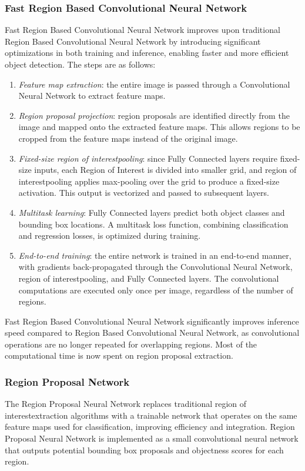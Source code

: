 \subsubsection{Fast Region Based Convolutional Neural Network}
Fast Region Based Convolutional Neural Network improves upon traditional Region Based Convolutional Neural Network by introducing significant optimizations in both training and inference, enabling faster and more efficient object detection.
The steps are as follows: 
\begin{enumerate}
    \item \textit{Feature map extraction}: the entire image is passed through a Convolutional Neural Network to extract feature maps.
    \item \textit{Region proposal projection}: region proposals are identified directly from the image and mapped onto the extracted feature maps. 
        This allows regions to be cropped from the feature maps instead of the original image.
    \item \textit{Fixed-size region of interestpooling}: since Fully Connected layers require fixed-size inputs, each Region of Interest is divided into smaller grid, and region of interestpooling applies max-pooling over the grid to produce a fixed-size activation. 
        This output is vectorized and passed to subsequent layers.
    \item \textit{Multitask learning}: Fully Connected layers predict both object classes and bounding box locations.
        A multitask loss function, combining classification and regression losses, is optimized during training.
    \item \textit{End-to-end training}: the entire network is trained in an end-to-end manner, with gradients back-propagated through the Convolutional Neural Network, region of interestpooling, and Fully Connected layers.
        The convolutional computations are executed only once per image, regardless of the number of regions.
\end{enumerate}
Fast Region Based Convolutional Neural Network significantly improves inference speed compared to Region Based Convolutional Neural Network, as convolutional operations are no longer repeated for overlapping regions.
Most of the computational time is now spent on region proposal extraction. 

\subsubsection{Region Proposal Network}
The Region Proposal Neural Network replaces traditional region of interestextraction algorithms with a trainable network that operates on the same feature maps used for classification, improving efficiency and integration. 
Region Proposal Neural Network is implemented as a small convolutional neural network that outputs potential bounding box proposals and objectness scores for each region.

